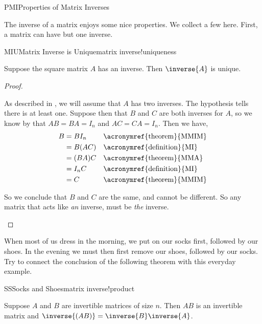 \begin{subsect}{PMI}{Properties of Matrix Inverses}
%
\begin{para}The inverse of a matrix enjoys some nice properties.  We collect a few here.  First, a matrix can have but one inverse.\end{para}
%
\begin{theorem}{MIU}{Matrix Inverse is Unique}{matrix inverse!uniqueness}
\begin{para}Suppose the square matrix $A$ has an inverse.  Then $\inverse{A}$ is unique.\end{para}
\end{theorem}
%
\begin{proof}
\begin{para}As described in , we will assume that $A$ has two inverses.  The hypothesis tells there is at least one.  Suppose then that $B$ and $C$ are both inverses for $A$, so we know by  that $AB=BA=I_n$ and $AC=CA=I_n$.  Then we have,
%
\begin{align*}
B
&=BI_n&&\text{\acronymref{theorem}{MMIM}}\\
&=B(AC)&&\text{\acronymref{definition}{MI}}\\
&=(BA)C&&\text{\acronymref{theorem}{MMA}}\\
&=I_nC&&\text{\acronymref{definition}{MI}}\\
&=C&&\text{\acronymref{theorem}{MMIM}}\\
\end{align*}
\end{para}
%
\begin{para}So we conclude that $B$ and $C$ are the same, and cannot be different.  So any matrix that acts like {\em an} inverse, must be {\em the} inverse.\end{para}
%
\end{proof}
%
\begin{para}When most of us dress in the morning, we put on our socks first, followed by our shoes.  In the evening we must then first remove our shoes, followed by our socks.  Try to connect the conclusion of the following theorem with this everyday example.\end{para}
%
\begin{theorem}{SS}{Socks and Shoes}{matrix inverse!product}
\begin{para}Suppose $A$ and $B$ are invertible matrices of size $n$.  Then $AB$ is an invertible matrix and $\inverse{(AB)}=\inverse{B}\inverse{A}$.\end{para}

\end{theorem}
\end{subsect}
